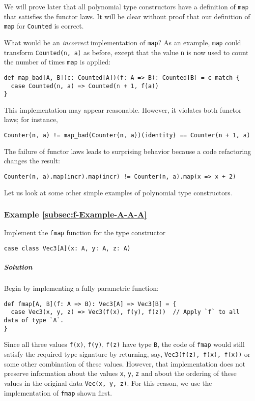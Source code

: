 We will prove later that all polynomial type constructors have a definition
of \lstinline!map! that satisfies the functor laws. It will be clear
without proof that our definition of \lstinline!map! for \lstinline!Counted!
is correct. 

What would be an \emph{incorrect} implementation of \lstinline!map!?
As an example, \lstinline!map! could transform \lstinline!Counted(n, a)!
as before, except that the value \lstinline!n! is now used to count
the number of times \lstinline!map! is applied:
\begin{lstlisting}
def map_bad[A, B](c: Counted[A])(f: A => B): Counted[B] = c match {
  case Counted(n, a) => Counted(n + 1, f(a))
}
\end{lstlisting}
This implementation may appear reasonable. However, it violates both
functor laws; for instance,
\begin{lstlisting}
Counter(n, a) != map_bad(Counter(n, a))(identity) == Counter(n + 1, a)
\end{lstlisting}
The failure of functor laws leads to surprising behavior because a
code refactoring changes the result:
\begin{lstlisting}
Counter(n, a).map(incr).map(incr) != Counter(n, a).map(x => x + 2)
\end{lstlisting}

Let us look at some other simple examples of polynomial type constructors.

\subsubsection{Example \label{subsec:f-Example-A-A-A}\ref{subsec:f-Example-A-A-A}}

Implement the \lstinline!fmap! function for the type constructor
\begin{lstlisting}
case class Vec3[A](x: A, y: A, z: A)
\end{lstlisting}


\subparagraph{Solution}

Begin by implementing a fully parametric function:
\begin{lstlisting}
def fmap[A, B](f: A => B): Vec3[A] => Vec3[B] = {
  case Vec3(x, y, z) => Vec3(f(x), f(y), f(z))  // Apply `f` to all data of type `A`.
}
\end{lstlisting}
Since all three values \lstinline!f(x)!, \lstinline!f(y)!, \lstinline!f(z)!
have type \lstinline!B!, the code of \lstinline!fmap! would still
satisfy the required type signature by returning, say, \lstinline!Vec3(f(z), f(x), f(x))!
or some other combination of these values. However, that implementation
does not preserve information about the values \lstinline!x!, \lstinline!y!,
\lstinline!z! and about the ordering of these values in the original
data \lstinline!Vec(x, y, z)!. For this reason, we use the implementation
of \lstinline!fmap! shown first.


